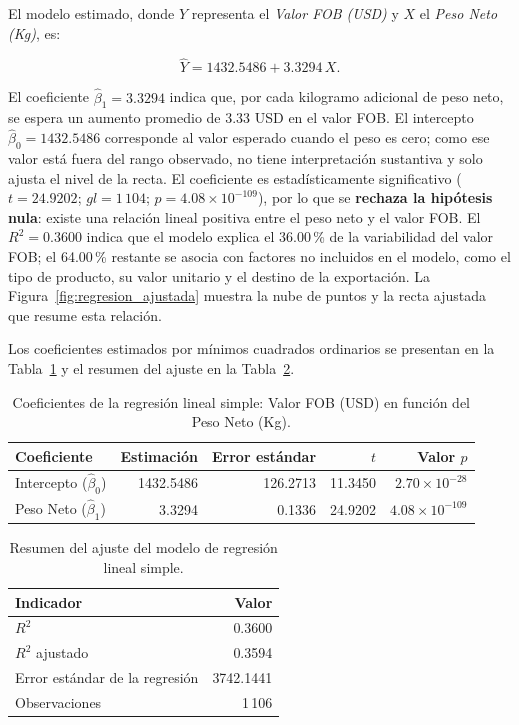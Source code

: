 \documentclass[12pt]{article}
\begin{document}
El modelo estimado, donde \(Y\) representa el \emph{Valor FOB (USD)} y
\(X\) el \emph{Peso Neto (Kg)}, es:

\[
\hat{Y} = 1432.5486 + 3.3294\,X.
\]

El coeficiente \(\hat{\beta}_1 = 3.3294\) indica que, por cada kilogramo
adicional de peso neto, se espera un aumento promedio de 3.33 USD en el
valor FOB. El intercepto \(\hat{\beta}_0 = 1432.5486\) corresponde al
valor esperado cuando el peso es cero; como ese valor está fuera del
rango observado, no tiene interpretación sustantiva y solo ajusta el
nivel de la recta. El coeficiente es estadísticamente significativo
(\(t = 24.9202\); \(gl = 1\,104\); \(p = 4.08 \times 10^{-109}\)), por lo
que se \textbf{rechaza la hipótesis nula}: existe una relación lineal
positiva entre el peso neto y el valor FOB. El \(R^2 = 0.3600\) indica
que el modelo explica el 36.00\,\% de la variabilidad del valor FOB;
el 64.00\,\% restante se asocia con factores no incluidos en el modelo,
como el tipo de producto, su valor unitario y el destino de la
exportación. La Figura~\ref{fig:regresion_ajustada} muestra la nube de
puntos y la recta ajustada que resume esta relación.

Los coeficientes estimados por mínimos cuadrados ordinarios se presentan
en la Tabla~\ref{tab:regresion} y el resumen del ajuste en la
Tabla~\ref{tab:ajuste_regresion}.

\begin{table}[htbp]
    \centering
    \caption{Coeficientes de la regresión lineal simple: Valor FOB (USD)
    en función del Peso Neto (Kg).}
    \label{tab:regresion}
    \small
    \begin{tabular}{>{\raggedright\arraybackslash}p{4.2cm}rrrr}
        \toprule
        Coeficiente & Estimación & Error estándar & $t$ & Valor $p$ \\
        \midrule
        Intercepto ($\hat{\beta}_0$) & 1432.5486 & 126.2713 & 11.3450 & $2.70 \times 10^{-28}$ \\
        Peso Neto ($\hat{\beta}_1$) & 3.3294 & 0.1336 & 24.9202 & $4.08 \times 10^{-109}$ \\
        \bottomrule
    \end{tabular}
\end{table}

\begin{table}[htbp]
    \centering
    \caption{Resumen del ajuste del modelo de regresión lineal simple.}
    \label{tab:ajuste_regresion}
    \begin{tabular}{lr}
        \toprule
        Indicador & Valor \\
        \midrule
        $R^2$ & 0.3600 \\
        $R^2$ ajustado & 0.3594 \\
        Error estándar de la regresión & 3742.1441 \\
        Observaciones & 1\,106 \\
        \bottomrule
    \end{tabular}
\end{table}
\FloatBarrier
\end{document}
